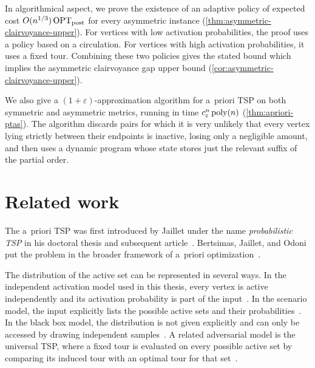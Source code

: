 \documentclass[12pt,a4paper,oneside]{report}
\begin{document}
In algorithmical aspect, we prove the existence of an adaptive policy of expected cost
$O(n^{1/3})\operatorname{OPT}_\mathrm{post}$ for every asymmetric instance
(\cref{thm:asymmetric-clairvoyance-upper}).  For vertices with low
activation probabilities, the proof uses a policy based on a circulation.
For vertices with high activation probabilities, it uses a fixed tour.
Combining these two policies gives the stated bound which implies the asymmetric
clairvoyance gap upper bound (\cref{cor:asymmetric-clairvoyance-upper}).

We also give a $(1{+}\varepsilon)$-approximation algorithm for a~priori TSP on
both symmetric and asymmetric metrics, running in time
$c_\varepsilon^n\operatorname{poly}(n)$ (\cref{thm:apriori-ptas}).
The algorithm discards pairs for which it is very unlikely that every
vertex lying strictly between their endpoints is inactive, losing only a
negligible amount, and then uses a dynamic program whose state stores just
the relevant suffix of the partial order.

\section{Related work}\label{sec:related}

The a~priori TSP was first introduced by Jaillet under the name
\emph{probabilistic TSP} in his doctoral thesis and subsequent 
article~\cite{Jaillet1985,Jaillet1988}. Bertsimas, Jaillet, and Odoni put
the problem in the broader framework of a~priori
optimization~\cite{BertsimasJailletOdoni1990}. 

The distribution of the active set can be represented in several ways. In the
independent activation model used in this thesis, every vertex is active
independently and its activation probability is part of the
input~\cite{Shmoys2008}. In the scenario model, the input explicitly lists
the possible active sets and their probabilities~\cite{vanEeIerselJanssenSitters2018}.
In the black box model, the distribution is not given explicitly and can only be
accessed by drawing independent samples~\cite{GorodezkyKleinbergShmoysSpencer2010}. A related
adversarial model is the universal TSP, where a fixed tour is evaluated on
every possible active set by comparing its induced tour with an optimal tour
for that set~\cite{SchalekampShmoys2008}.
\end{document}
